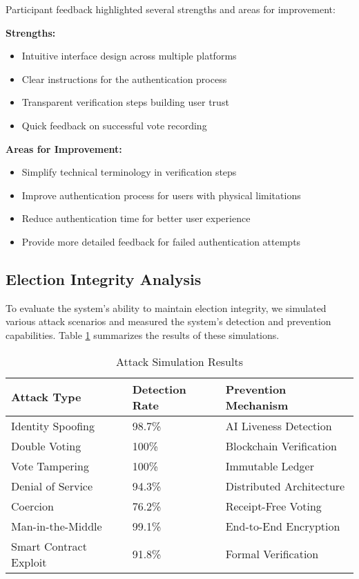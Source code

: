 \documentclass[conference]{IEEEtran}
\begin{document}
Participant feedback highlighted several strengths and areas for improvement:

\textbf{Strengths:}
\begin{itemize}
    \item Intuitive interface design across multiple platforms
    \item Clear instructions for the authentication process
    \item Transparent verification steps building user trust
    \item Quick feedback on successful vote recording
\end{itemize}

\textbf{Areas for Improvement:}
\begin{itemize}
    \item Simplify technical terminology in verification steps
    \item Improve authentication process for users with physical limitations
    \item Reduce authentication time for better user experience
    \item Provide more detailed feedback for failed authentication attempts
\end{itemize}

\subsection{Election Integrity Analysis}
To evaluate the system's ability to maintain election integrity, we simulated various attack scenarios and measured the system's detection and prevention capabilities. Table \ref{tab:attacks} summarizes the results of these simulations.

\begin{table}[!h]
\caption{Attack Simulation Results}
\label{tab:attacks}
\centering
\begin{tabular}{|p{2.5cm}|p{2.5cm}|p{3cm}|}
\hline
\textbf{Attack Type} & \textbf{Detection Rate} & \textbf{Prevention Mechanism} \\
\hline
Identity Spoofing & 98.7\% & AI Liveness Detection \\
\hline
Double Voting & 100\% & Blockchain Verification \\
\hline
Vote Tampering & 100\% & Immutable Ledger \\
\hline
Denial of Service & 94.3\% & Distributed Architecture \\
\hline
Coercion & 76.2\% & Receipt-Free Voting \\
\hline
Man-in-the-Middle & 99.1\% & End-to-End Encryption \\
\hline
Smart Contract Exploit & 91.8\% & Formal Verification \\
\hline
\end{tabular}
\end{table}
\end{document}
